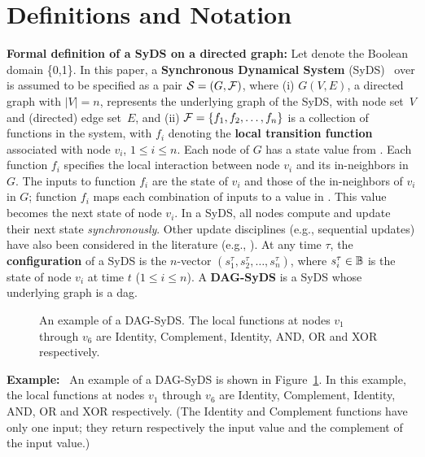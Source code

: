 \section{Definitions and Notation}
\label{sec:defs}

\noindent
\textbf{Formal definition of a SyDS on a directed graph:}
Let \bbb{} denote the Boolean domain \{0,1\}.
In this paper, a \textbf{Synchronous Dynamical System} (SyDS)~
\cals{} over \bbb{} is assumed to be specified as
a pair ${\mbox{$\mathcal{S}$}}  = (G, {\mbox{$\mathcal{F}$}})$, where
(i) $G(V,E)$, a directed graph with $|V| = n$,
represents the underlying graph of the SyDS,
with node set~$V$ and (directed) edge set~$E$, and
(ii) ${\mbox{$\mathcal{F}$}} = \{f_1, f_2, \ldots, f_n \}$ is a collection of
functions in the system, with
$f_i$ denoting the \textbf{local transition
function} associated with node $v_i$, $1 \leq i \leq n$.
Each node of $G$ has a state value from \bbb.
Each function $f_i$ specifies the local interaction
between node $v_i$ and its in-neighbors in $G$.
The inputs to function $f_i$ are the state of $v_i$ and
those of the in-neighbors of $v_i$ in $G$;
function $f_i$ maps
each combination of inputs to a value in \bbb.
This value becomes the next state of node $v_i$.
In a SyDS, all nodes compute and update their next state
\emph{synchronously}.
Other update disciplines (e.g., sequential updates)
have also been considered in the literature (e.g., \cite{MR-2007}).
At any time $\tau$,
the {\bf configuration} \calc{} of a SyDS
is the $n$-vector $(s_1^{\tau}, s_2^{\tau}, \ldots, s_n^{\tau})$,
where $s_i^{\tau} \in \mbox{$\mathbb{B}$}$ is the state of
node $v_i$ at time $t$ ($1 \leq i \leq n$).
A \textbf{DAG-SyDS} is a SyDS whose underlying graph is a dag.

\begin{figure}
\begin{center}

\end{center}
\caption{An example of a DAG-SyDS.
The local functions at nodes $v_1$ through
$v_6$ are Identity, Complement, Identity, AND, OR and
XOR respectively.}
\label{fig:ex_dag_syds}
\end{figure}

\smallskip

\noindent
\textbf{Example:}~ An example of a DAG-SyDS is shown in
Figure~\ref{fig:ex_dag_syds}.
In this example, the local functions at nodes $v_1$ through
$v_6$ are Identity, Complement, Identity, AND, OR and
XOR respectively.
(The Identity and Complement functions have only one input;
they return respectively the input value and the complement of
the input value.)


